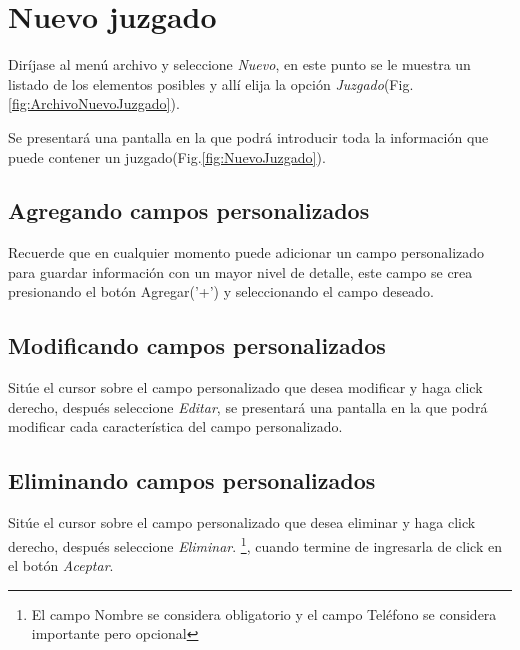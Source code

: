 \section{Nuevo juzgado}
\label{sec:nuevoJuzgado}
Dir\'ijase al men\'u archivo y seleccione \emph{Nuevo}, en este punto se le muestra un listado de los elementos posibles y
all\'i elija la opci\'on \emph{Juzgado}(Fig.\ref{fig:ArchivoNuevoJuzgado}). 
  

Se presentar\'a una pantalla en la que podr\'a introducir toda la informaci\'on
que puede contener un juzgado(Fig.\ref{fig:NuevoJuzgado}). 
  

\subsection{Agregando campos personalizados}
\label{sec:agregarCamposJuzgado}
Recuerde que en cualquier momento puede adicionar un campo personalizado para guardar informaci\'on con un mayor nivel de detalle, este campo se crea presionando el bot\'on Agregar('+') y seleccionando el campo deseado.

\subsection{Modificando campos personalizados}
\label{sec:modificarCamposJuzgado}
Sit\'ue el cursor sobre el campo personalizado que desea modificar y haga click derecho, despu\'es seleccione \emph{Editar},
se presentar\'a una pantalla en la que podr\'a modificar cada caracter\'istica
del campo personalizado.

\subsection{Eliminando campos personalizados}
\label{sec:eliminarCamposJuzgado}
Sit\'ue el cursor sobre el campo personalizado que desea eliminar y haga click derecho, despu\'es seleccione \emph{Eliminar}.
\footnote{El campo Nombre se considera obligatorio y el campo Tel\'efono se
considera importante pero opcional},
cuando termine de ingresarla de click en el bot\'on \emph{Aceptar}.